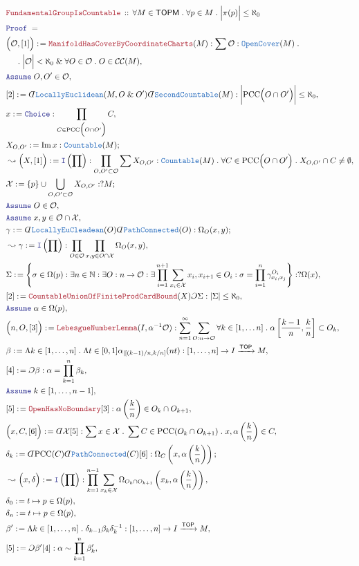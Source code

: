 \documentclass[12pt]{scrartcl}
\newcommand{\TYPE}[1]{\textcolor{NavyBlue}{\mathtt{#1}}}
\newcommand{\LOGIC}[1]{\textcolor{Blue}{\mathtt{#1}}}
\newcommand{\THM}[1]{\textcolor{Maroon}{\mathtt{#1}}}
\renewcommand{\.}{\; . \;}
\newcommand{\de}{: \kern 0.1pc =}
\newcommand{\Act}[1]{\left( #1 \right)}
\newcommand{\Theorem}[2]{& \THM{#1} \, :: \, #2 \\ & \Proof = \\ }
\newcommand{\NewLine}{\\ & \kern 1pc}
\newcommand{\Page}[1]{ \begin{align*} #1 \end{align*}   }
\newcommand{ \bd }{ \ByDef }
\renewcommand{\And}{\; \& \;}
\newcommand{\Intro}{\LOGIC{I}}
\newcommand{\Nat}{\mathbb{N} }
\DeclareMathOperator*{\im}{Im}
\newcommand{\Arrow}{\xrightarrow}
\newcommand{\Say}[3]{& #1 \de #2 : #3, \\}
\newcommand{\SayIn}[3]{& #1 \de #2 \in #3, \\}
\newcommand{\Conclude}[3]{& #1 \de #2 : #3; \\}
\newcommand{\Derive}[3]{& \leadsto #1 \de #2 : #3, \\}
\newcommand{\AssumeIn}[2]{& \LOGIC{Assume} \; #1 \in #2, \\}
\newcommand{\ByDef}{\rotatebox[origin=c]{-180}{$D$}}%
\newcommand{\ByConstr}{\rotatebox[origin=c]{-180}{$C$}}%
\newcommand{\Proof}{\LOGIC{Proof} \; }
\newcommand{\C}{\mathcal{C}}
\newcommand{\TOP}{\mathsf{TOP}}
\renewcommand{\O}{\mathcal{O}}
\newcommand{\X}{\mathcal{X}}
\newcommand{\TOPM}{\mathsf{TOPM}}
\renewcommand{\O}{\mathcal{O}}
\begin{document}
\Page{
	\Theorem{FundamentalGroupIsCountable}
	{
		\forall M \in \TOPM \.
		\forall p \in M \.
		\Big|\pi(p)\Big| \le \aleph_0
	}
	\Say{\Big(\O,[1]\Big)}{\THM{ManifoldHasCoverByCoordinateCharts}(M)}
	{
		\sum \O : \TYPE{OpenCover}(M) \. \NewLine \.
		\Big|\O\Big| < \aleph_0 
		\And
		\forall O \in \O \.
		O \in \C\C(M)
	}
	\AssumeIn{O,O'}{\O}
	\Say{[2]}{
		\bd \TYPE{LocallyEuclidean}(M,O \And O')
		\bd \TYPE{SecondCountable}(M)
	}
	{
		\bigg|\mathrm{PCC}\Big( O \cap O' \Big)\bigg| \le \aleph_0
	}
	\Say{x}{\LOGIC{Choice}}{\prod_{C \in \mathrm{PCC}\Big( O \cap O' \Big)} C}
	\Conclude{X_{O,O'}}{\im x}{\TYPE{Countable}(M)}
	\Derive{\Big(X, [1]\Big)}{\Intro\Act{\prod}}
	{
		\prod_{O,O' \subset \O}  
		\sum X_{O,O'}  : \TYPE{Countable}(M) \.
		\forall C \in \mathrm{PCC}\Big( O \cap O' \Big) \.
		X_{O,O'} \cap C \neq \emptyset
	}
	\Conclude{\X}{\{p\} \cup \bigcup_{O,O' \subset \O} X_{O,O'}}{?M}
	\AssumeIn{O}{\O}
	\AssumeIn{x,y}{\O \cap \X}
	\Conclude{\gamma}{\bd \TYPE{LocallyEuCleadean}(O) \bd \TYPE{PathConnected}(O)}
	{
		\Omega_O(x,y)
	}
	\Derive{\gamma}{\Intro\Act{\prod}}{\prod_{O \in \O} \prod_{x,y \in O \cap \X} \Omega_O(x,y)}
	\Say{\Sigma}{\left\{ 
			\sigma \in \Omega(p) : 
				\exists n \in \Nat : 
				\exists O : n \to \O :
				\exists \prod^{n+1}_{i=1} \sum_{x_i \in \X}  x_i,x_{i+1} \in O_i :
				\sigma = \prod^n_{i=1} \gamma^{O_i}_{x_i,x_j} 
		\right\}
	}{?\Omega(x)}
	\Say{[2]}{\THM{CountableUnionOfFiniteProdCardBound}(X)\ByConstr \Sigma}
	{
		|\Sigma| \le \aleph_0
	}
	\AssumeIn{\alpha}{\Omega(p)}
	\Say{\Big(n,O,[3]\Big)}{\THM{LebesgueNumberLemma}(I,\alpha^{-1}\O)}
	{
		\sum_{n=1}^\infty \sum_{O : n \to \O} \forall k \in [1,\ldots n] \.
		\alpha\left[ \frac{k-1}{n}, \frac{k}{n} \right] \subset O_k
	}
	\Say{\beta}{\Lambda k \in [1,\ldots,n] \. \Lambda t \in [0,1] \alpha_{|[(k-1)/n,k/n]}(nt)}
	{
		[1,\ldots,n] \to I \Arrow{\TOP} M
	}
	\Say{[4]}{\ByConstr \beta}{\alpha = \prod^n_{k=1} \beta_k}
	\AssumeIn{k}{[1,\ldots,n-1]}
	\Say{[5]}{\THM{OpenHasNoBoundary}[3]}
	{
		\alpha\left(\frac{k}{n}\right) \in O_k \cap O_{k+1}
	}
	\Say{\Big(x, C, [6] \Big)}{\bd \X[5]}
	{ 
		\sum x \in \X \. \sum  C  \in \mathrm{PCC}( O_k \cap O_{k+1}) \. 
		x, \alpha\Act{\frac{k}{n}} \in C
	}
	\Conclude{\delta_k}{\bd \mathrm{PCC}(C)\bd \TYPE{PathConnected}(C)[6]}{\Omega_C\Act{x,\alpha\Act{\frac{k}{n}}}}
	\Derive{\Big(x,\delta\Big)}{\Intro\Act{\prod}}
	{
		\prod^{n-1}_{k=1} \sum_{x_k \in \X} \Omega_{O_k \cap O_{k+1}}\Act{x_k,\alpha\Act{\frac{k}{n}}}
	}
	\SayIn{\delta_0}{t \mapsto p}{\Omega(p)}
	\SayIn{\delta_n}{t \mapsto p}{\Omega(p)}
	\Say{\beta'}{\Lambda k \in [1,\ldots,n] \. \delta_{k-1}\beta_k \delta_k^{-1}}{[1,\ldots,n] \to I \Arrow{\TOP} M}
	\Say{[5]}{\ByConstr \beta' [4]}{\alpha \sim \prod^n_{k=1} \beta'_k}
}
\end{document}
